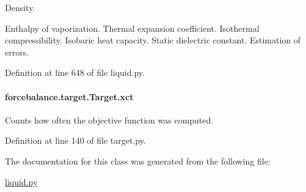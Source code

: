 Density. 

Enthalpy of vaporization. Thermal expansion coefficient. Isothermal compressibility. Isobaric heat capacity. Static dielectric constant. Estimation of errors. 

Definition at line 648 of file liquid.\-py.

\hypertarget{classforcebalance_1_1target_1_1Target_aad2e385cfbf7b4a68f1c2cb41133fe82}{
\paragraph[{xct}]{\setlength{\rightskip}{0pt plus 5cm}forcebalance.\-target.\-Target.\-xct\hspace{0.3cm}{\ttfamily [inherited]}}}\label{classforcebalance_1_1target_1_1Target_aad2e385cfbf7b4a68f1c2cb41133fe82}


Counts how often the objective function was computed. 



Definition at line 140 of file target.\-py.



The documentation for this class was generated from the following file\-:\begin{DoxyCompactItemize}
\item 
\hyperlink{liquid_8py}{liquid.\-py}\end{DoxyCompactItemize}
